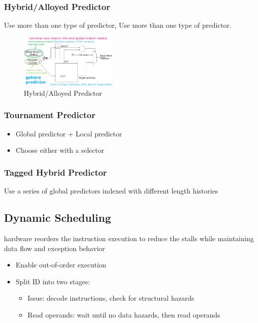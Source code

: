 \subsubsection{Hybrid/Alloyed Predictor}
Use more than one type of predictor, Use more than one type of predictor.
\begin{figure}[!htb]
    \centering
    \includegraphics[width=0.42\textwidth]{pic/CA3/Hybrid Predictor}
    \caption{Hybrid/Alloyed Predictor}
\end{figure}

\subsubsection{Tournament Predictor}
\begin{itemize}
    \item Global predictor + Local predictor
    \item Choose either with a selector
\end{itemize}

\subsubsection{Tagged Hybrid Predictor}
Use a series of global predictors indexed with different length histories

\subsection{Dynamic Scheduling}
hardware reorders the instruction execution to reduce the stalls while maintaining data flow and exception behavior

\begin{itemize}
    \item Enable out-of-order execution
    \item Split ID into two stages:
    \begin{itemize}
        \item Issue: decode instructions, check for structural hazards
        \item Read operands: wait until no data hazards, then read operands
    \end{itemize}
\end{itemize}

